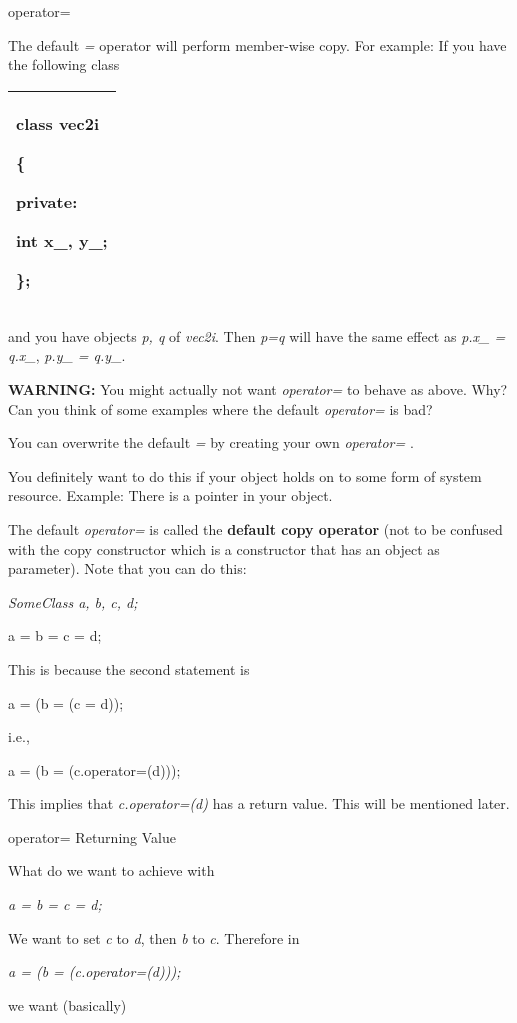 \documentclass[
]{article}
\begin{document}
operator=

The default \emph{=} operator will perform member-wise copy. For
example: If you have the following class

\begin{longtable}[]{@{}l@{}}
\toprule
\endhead
\begin{minipage}[t]{0.97\columnwidth}\raggedright
class vec2i

\{

private:

int x\_, y\_;

\};\strut
\end{minipage}\tabularnewline
\bottomrule
\end{longtable}

and you have objects \emph{p, q} of \emph{vec2i}. Then \emph{p=q} will
have the same effect as \emph{p.x\_ = q.x\_}, \emph{p.y\_ = q.y\_}.

\textbf{WARNING:} You might actually not want \emph{operator=} to behave
as above. Why? Can you think of some examples where the default
\emph{operator=} is bad?

You can overwrite the default \emph{=} by creating your own
\emph{operator=} .

You definitely want to do this if your object holds on to some form of
system resource. Example: There is a pointer in your object.

The default \emph{operator=} is called the \textbf{default copy
operator} (not to be confused with the copy constructor which is a
constructor that has an object as parameter). Note that you can do this:

\emph{SomeClass a, b, c, d;}

a = b = c = d;

This is because the second statement is

a = (b = (c = d));

i.e.,

a = (b = (c.operator=(d)));

This implies that \emph{c.operator=(d)} has a return value. This will be
mentioned later.

operator= Returning Value

What do we want to achieve with

\emph{a = b = c = d;}

We want to set \emph{c} to \emph{d}, then \emph{b} to \emph{c}.
Therefore in

\emph{a = (b = (c.operator=(d)));}

we want (basically)
\end{document}
